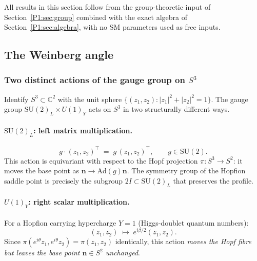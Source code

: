 \documentclass[11pt,a4paper]{article}
\theoremstyle{definition}
\theoremstyle{remark}
\begin{document}
All results in this section follow from the group-theoretic input of
Section~\ref{P1:sec:group} combined with the exact algebra of
Section~\ref{P1:sec:algebra}, with no SM parameters used as free inputs.

\subsection{The Weinberg angle}
\label{P1:sec:weinberg}
 
\subsubsection{Two distinct actions of the gauge group on $S^3$}
\label{P1:sec:s3action}
 
Identify $S^3\subset\mathbb{C}^2$ with the unit sphere
$\{(z_1,z_2):|z_1|^2+|z_2|^2=1\}$.  The gauge group
$\mathrm{SU}(2)_L\times U(1)_Y$ acts on $S^3$ in two structurally
different ways.
 
\paragraph{$\mathrm{SU}(2)_L$: left matrix multiplication.}
\begin{equation}
  g\cdot(z_1,z_2)^\top \;=\; g\,(z_1,z_2)^\top, \qquad g\in\mathrm{SU}(2).
  \label{P1:eq:left}
\end{equation}
This action is equivariant with respect to the Hopf projection
$\pi:S^3\to S^2$: it moves the base point as $\mathbf{n}\to\mathrm{Ad}(g)\mathbf{n}$.
The symmetry group of the Hopfion saddle point is precisely the
subgroup $2I\subset\mathrm{SU}(2)_L$ that preserves the profile.
 
\paragraph{$U(1)_Y$: right scalar multiplication.}
For a Hopfion carrying hypercharge $Y=1$ (Higgs-doublet quantum numbers):
\begin{equation}
  (z_1,z_2) \;\longmapsto\; e^{i\beta/2}(z_1,z_2).
  \label{P1:eq:right}
\end{equation}
Since $\pi(e^{i\theta}z_1,e^{i\theta}z_2)=\pi(z_1,z_2)$ identically,
this action \emph{moves the Hopf fibre but leaves the base point
$\mathbf{n}\in S^2$ unchanged}.
 
\end{document}
